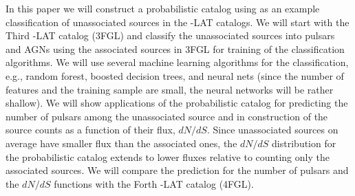 In this paper we will construct a probabilistic catalog using as an example classification of unassociated sources in the \Fermi-LAT catalogs. 
We will start with the Third \Fermi-LAT catalog (3FGL) and classify the unassociated sources into pulsars and AGNs using the associated sources in 3FGL for training of the classification algorithms.
We will use several machine learning algorithms for the classification, e.g., random forest, boosted decision trees, and neural nets
(since the number of features and the training sample are small, the neural networks will be rather shallow).
We will show applications of the probabilistic catalog for predicting the number of pulsars among the unassociated source and in construction of the source counts as a function of their flux, $dN/dS$.
Since unassociated sources on average have smaller flux than the associated ones, the $dN/dS$ distribution for the probabilistic catalog extends to lower fluxes relative to counting only the associated sources.
We will compare the prediction for the number of pulsars and the $dN/dS$ functions with the Forth \Fermi-LAT catalog (4FGL).



